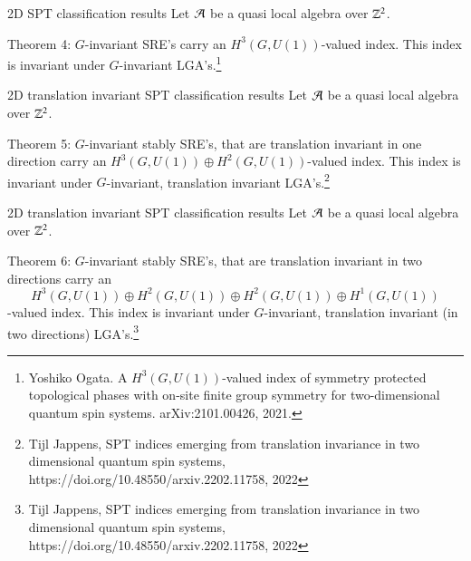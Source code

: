 \documentclass{beamer}
\begin{document}
\begin{frame}{2D SPT classification results}
Let $\AA$ be a quasi local algebra over $\ZZ^2$.
\begin{block}{Theorem 4:}
$G$-invariant SRE's carry an $H^3(G,U(1))$-valued index. This index is invariant under $G$-invariant LGA's.\footnote{Yoshiko Ogata. A $H^3(G,U(1))$-valued index of symmetry protected topological phases with on-site finite group symmetry for two-dimensional quantum spin systems. arXiv:2101.00426, 2021.}
\end{block}
\end{frame}

\begin{frame}{2D translation invariant SPT classification results}
Let $\AA$ be a quasi local algebra over $\ZZ^2$.
\begin{block}{Theorem 5:}
$G$-invariant stably SRE's, that are translation invariant in one direction carry an $H^3(G,U(1))\oplus H^2(G,U(1))$-valued index. This index is invariant under $G$-invariant, translation invariant LGA's.\footnote{Tijl Jappens, SPT indices emerging from translation invariance in two dimensional quantum spin systems, https://doi.org/10.48550/arxiv.2202.11758, 2022}
\end{block}
\end{frame}

\begin{frame}{2D translation invariant SPT classification results}
Let $\AA$ be a quasi local algebra over $\ZZ^2$.
\begin{block}{Theorem 6:}
$G$-invariant stably SRE's, that are translation invariant in two directions carry an
\[H^3(G,U(1))\oplus H^2(G,U(1))\oplus H^2(G,U(1))\oplus H^1(G,U(1))\]
-valued index. This index is invariant under $G$-invariant, translation invariant (in two directions) LGA's.\footnote{Tijl Jappens, SPT indices emerging from translation invariance in two dimensional quantum spin systems, https://doi.org/10.48550/arxiv.2202.11758, 2022}
\end{block}
\end{frame}
\end{document}

